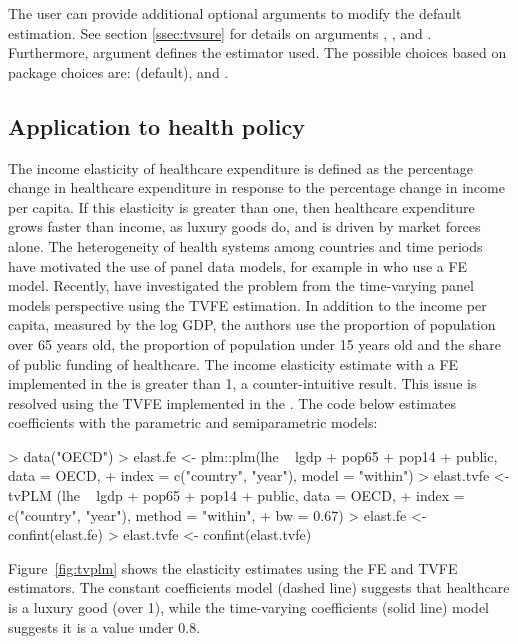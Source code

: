 The user can provide additional optional arguments to modify the default estimation. See section \ref{ssec:tvsure} for details on arguments , ,  and . Furthermore, argument  defines the estimator used. The possible choices based on package  choices are:  (default),  and .

\subsection{Application to health policy}

The income elasticity of healthcare expenditure is defined as the percentage change in healthcare expenditure in response to the percentage change in income per capita. If this elasticity is greater than one, then healthcare expenditure grows faster than income, as luxury goods do, and is driven by market forces alone. The heterogeneity of health systems among countries and time periods have motivated the use of panel data models, for example in \citet{Gerdthametal1992} who use a FE model. Recently, \citet{Casasetal2019b} have investigated the problem from the time-varying panel models perspective using the TVFE estimation. In addition to the income per capita, measured by the log GDP, the authors use the proportion of population over 65 years old, the proportion of population under 15 years old and the share of public funding of healthcare. The income elasticity estimate with a FE implemented in the  is greater than 1, a counter-intuitive result. This issue is resolved using the TVFE implemented in the . The code below estimates coefficients with the parametric and semiparametric models:

\begin{Schunk}
\begin{Sinput}
> data("OECD")
> elast.fe <- plm::plm(lhe ~ lgdp + pop65 + pop14 + public, data = OECD, 
+                      index = c("country", "year"), model = "within")
> elast.tvfe <- tvPLM (lhe ~ lgdp + pop65 + pop14 + public, data = OECD, 
+                      index = c("country", "year"), method = "within",
+                      bw = 0.67)
> elast.fe <- confint(elast.fe)
> elast.tvfe <- confint(elast.tvfe)
\end{Sinput}
\end{Schunk}

Figure~\ref{fig:tvplm} shows the elasticity estimates using the FE and TVFE estimators. The constant coefficients model (dashed line) suggests that healthcare is a luxury good (over 1), while the time-varying coefficients (solid line) model suggests it is a value under 0.8. 


